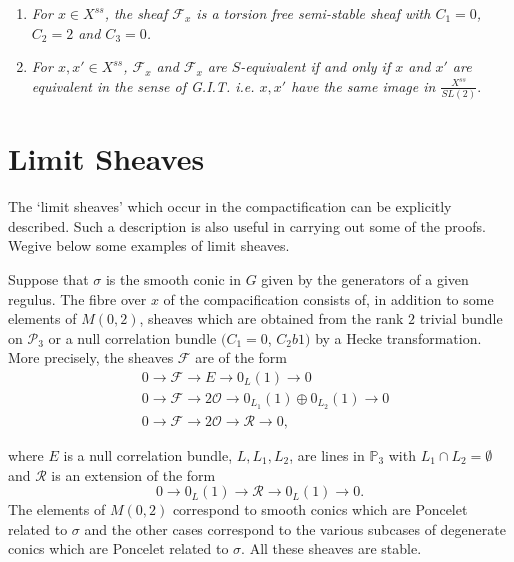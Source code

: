 \begin{Prop}
\begin{enumerate}
\renewcommand{\labelenumi}{(\theenumi)}
\item \textit{For $x\in X^{ss}$, the sheaf $\mathscr{F}_x$ is a torsion free semi-stable sheaf with $C_1=0$, $C_2=2$ and $C_3=0$.}
\item \textit{For $x,x'\in X^{ss}$, $\mathscr{F}_x$ and $\mathscr{F}_x$ are $S$-equivalent if and only if $x$ and $x'$ are equivalent in the sense of G.I.T. i.e. $x,x'$ have the same image in $\frac{X^{ss}}{SL(2)}$}.
\end{enumerate}
\end{Prop}

\section{Limit Sheaves}\label{s8}

The `limit sheaves' which occur in the  compactification can be explicitly described. Such a description is also useful in carrying out some of the proofs. We\pageoriginale give below some examples of limit sheaves. 

\begin{EXP1}
Suppose that $\sigma$ is the smooth conic in $G$ given by the generators of a given regulus. The fibre over $x$ of the compacification consists of, in addition to some elements of $M(0,2)$, sheaves which are obtained from the rank $2$ trivial bundle on $\mathscr{P}_3$ or a null correlation bundle $(C_1=0$, $C_2b 1)$ by a Hecke transformation. More precisely, the sheaves $\mathscr{F}$ are of the form 
$$
\begin{aligned}
&0\to \mathscr{F}\to E\to 0_L(1)\to 0\\
&{}0\to \mathscr{F}\to 2\mathscr{O}\to 0_{L_1}(1)\oplus 0_{L_2}(1)\to 0\\
&{}0\to \mathscr{F}\to 2\mathscr{O}\to \mathscr{R}\to 0,
\end{aligned}
$$
\end{EXP1}
where $E$ is a null correlation bundle, $L,L_1,L_2$, are lines in $\mathbb{P}_3$ with $L_1\cap L_2=\emptyset$  and $\mathscr{R}$ is an extension of the form 
$$
0\to 0_L(1)\to \mathscr{R}\to 0_L(1)\to 0.
$$
The elements of $M(0,2)$ correspond to smooth conics which are Poncelet related to $\sigma$ and the other cases correspond to the various subcases of degenerate conics which are Poncelet related to $\sigma$. All these sheaves are stable. 

